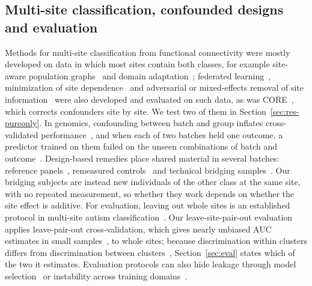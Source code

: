 \subsection{Multi-site classification, confounded designs and evaluation}

Methods for multi-site classification from functional connectivity were mostly developed on data in which most sites contain both classes, for example site-aware population graphs~\cite{parisot2018,wu2027croip} and domain adaptation~\cite{song2024braindas,fang2025scda}; federated learning~\cite{wang2025gafd}, minimization of site dependence~\cite{kunda2023} and adversarial or mixed-effects removal of site information~\cite{ganin2016,dinsdale2021,zhao2020cfnet,nguyen2023armed} were also developed and evaluated on such data, as was CORE~\cite{wang2026core}, which corrects confounders site by site. We test two of them in Section~\ref{sec:res-pureonly}. In genomics, confounding between batch and group inflates cross-validated performance~\cite{soneson2014}, and when each of two batches held one outcome, a predictor trained on them failed on the unseen combinations of batch and outcome~\cite{parker2012}. Design-based remedies place shared material in several batches: reference panels~\cite{song2020}, remeasured controls~\cite{ye2023} and technical bridging samples~\cite{bridge2022}. Our bridging subjects are instead new individuals of the other class at the same site, with no repeated measurement, so whether they work depends on whether the site effect is additive. For evaluation, leaving out whole sites is an established protocol in multi-site autism classification~\cite{abraham2017}. Our leave-site-pair-out evaluation applies leave-pair-out cross-validation, which gives nearly unbiased AUC estimates in small samples~\cite{airola2011}, to whole sites; because discrimination within clusters differs from discrimination between clusters~\cite{vanklaveren2014}, Section~\ref{sec:eval} states which of the two it estimates. Evaluation protocols can also hide leakage through model selection~\cite{yang2027} or instability across training domains~\cite{zhang2025pf2hc}.
